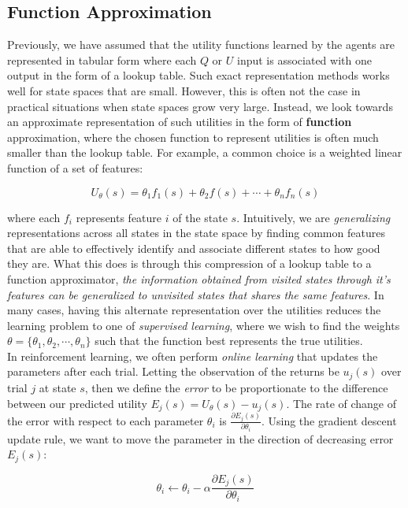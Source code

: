\documentclass[11pt]{article}
\begin{document}
\subsection{Function Approximation}

Previously, we have assumed that the utility functions learned by the agents are represented in tabular form where each $Q$ or $U$ input is associated with one output in the form of a lookup table. Such exact representation methods works well for state spaces that are small. However, this is often not the case in practical situations when state spaces grow very large. Instead, we look towards an approximate representation of such utilities in the form of \textbf{function} approximation, where the chosen function to represent utilities is often much smaller than the lookup table. For example, a common choice is a weighted linear function of a set of features:

$$
U_{\theta}(s) = \theta_1 f_1(s) + \theta_2 f(s) + \cdots + \theta_n f_n(s)
$$

where each $f_i$ represents feature $i$ of the state $s$. Intuitively, we are \textit{generalizing} representations across all states in the state space by finding common features that are able to effectively identify and associate different states to how good they are. What this does is through this compression of a lookup table to a function approximator, \textit{the information obtained from visited states through it's features can be generalized to unvisited states that shares the same features}. In many cases, having this alternate representation over the utilities reduces the learning problem to one of \textit{supervised learning}, where we wish to find the weights $\theta = \{\theta_1, \theta_2, \cdots, \theta_n \}$ such that the function best represents the true utilities.\\

In reinforcement learning, we often perform \textit{online learning} that updates the parameters after each trial. Letting the observation of the returns be $u_j(s)$ over trial $j$ at state $s$, then we define the \textit{error} to be proportionate to the difference between our predicted utility $E_j(s) = U_{\theta}(s) - u_j(s)$. The rate of change of the error with respect to each parameter $\theta_i$ is $\frac{\partial E_j(s)}{\partial \theta_i}$. Using the gradient descent update rule, we want to move the parameter in the direction of decreasing error $E_j(s)$:

$$
\theta_i \leftarrow \theta_i - \alpha \frac{\partial E_j(s)}{\partial \theta_i}
$$
\end{document}
